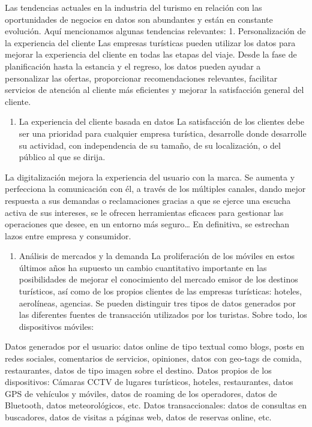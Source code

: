 \documentclass[
  letterpaper,
  DIV=11,
  numbers=noendperiod]{scrreprt}
\providecommand{\tightlist}{%
  \setlength{\itemsep}{0pt}\setlength{\parskip}{0pt}}\usepackage{longtable,booktabs,array}
\begin{document}
Las tendencias actuales en la industria del turismo en relación con las
oportunidades de negocios en datos son abundantes y están en constante
evolución. Aquí mencionamos algunas tendencias relevantes: 1.
Personalización de la experiencia del cliente Las empresas turísticas
pueden utilizar los datos para mejorar la experiencia del cliente en
todas las etapas del viaje. Desde la fase de planificación hasta la
estancia y el regreso, los datos pueden ayudar a personalizar las
ofertas, proporcionar recomendaciones relevantes, facilitar servicios de
atención al cliente más eficientes y mejorar la satisfacción general del
cliente.

\begin{enumerate}
\def\labelenumi{\arabic{enumi}.}
\setcounter{enumi}{1}
\tightlist
\item
  La experiencia del cliente basada en datos La satisfacción de los
  clientes debe ser una prioridad para cualquier empresa turística,
  desarrolle donde desarrolle su actividad, con independencia de su
  tamaño, de su localización, o del público al que se dirija.
\end{enumerate}

La digitalización mejora la experiencia del usuario con la marca. Se
aumenta y perfecciona la comunicación con él, a través de los múltiples
canales, dando mejor respuesta a sus demandas o reclamaciones gracias a
que se ejerce una escucha activa de sus intereses, se le ofrecen
herramientas eficaces para gestionar las operaciones que desee, en un
entorno más seguro\ldots{} En definitiva, se estrechan lazos entre
empresa y consumidor.

\begin{enumerate}
\def\labelenumi{\arabic{enumi}.}
\setcounter{enumi}{2}
\tightlist
\item
  Análisis de mercados y la demanda La proliferación de los móviles en
  estos últimos años ha supuesto un cambio cuantitativo importante en
  las posibilidades de mejorar el conocimiento del mercado emisor de los
  destinos turísticos, así como de los propios clientes de las empresas
  turísticas: hoteles, aerolíneas, agencias. Se pueden distinguir tres
  tipos de datos generados por las diferentes fuentes de transacción
  utilizados por los turistas. Sobre todo, los dispositivos móviles:
\end{enumerate}

Datos generados por el usuario: datos online de tipo textual como blogs,
posts en redes sociales, comentarios de servicios, opiniones, datos con
geo-tags de comida, restaurantes, datos de tipo imagen sobre el destino.
Datos propios de los dispositivos: Cámaras CCTV de lugares turísticos,
hoteles, restaurantes, datos GPS de vehículos y móviles, datos de
roaming de los operadores, datos de Bluetooth, datos meteorológicos,
etc. Datos transaccionales: datos de consultas en buscadores, datos de
visitas a páginas web, datos de reservas online, etc.
\end{document}
